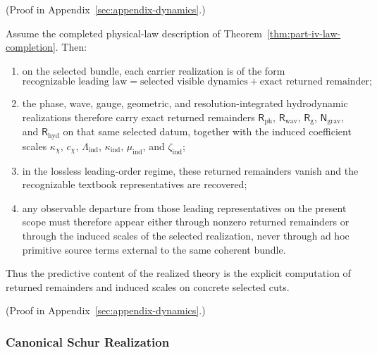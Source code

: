 (Proof in Appendix~\ref{sec:appendix-dynamics}.)

\begin{theorem}
\label{thm:returned-remainders-form-predictive-correction-surface}
Assume the completed physical-law description of
Theorem~\ref{thm:part-iv-law-completion}. Then:
\begin{enumerate}[label=(\alph*), leftmargin=2em, itemsep=0.2em]
\item on the selected bundle, each carrier realization is of the form
      \[
      \text{recognizable leading law}
      =
      \text{selected visible dynamics}
      +
      \text{exact returned remainder};
      \]
\item the phase, wave, gauge, geometric, and resolution-integrated
      hydrodynamic realizations therefore carry exact returned remainders
      \(\mathsf R_{\mathrm{ph}}\),
      \(\mathsf R_{\mathrm{wav}}\),
      \(\mathsf R_{\mathrm g}\),
      \(\mathsf N_{\mathrm{grav}}\), and
      \(\mathsf R_{\mathrm{hyd}}\) on that same selected datum, together with
      the induced coefficient scales
      \(\kappa_{\chi}\),
      \(c_{\chi}\),
      \(\Lambda_{\mathrm{ind}}\),
      \(\kappa_{\mathrm{ind}}\),
      \(\mu_{\mathrm{ind}}\), and
      \(\zeta_{\mathrm{ind}}\);
\item in the lossless leading-order regime, these returned remainders vanish
      and the recognizable textbook representatives are recovered;
\item any observable departure from those leading representatives on the
      present scope must therefore appear either through nonzero returned
      remainders or through the induced scales of the selected realization,
      never through ad hoc primitive source terms external to the same
      coherent bundle.
\end{enumerate}
Thus the predictive content of the realized theory is the explicit computation
of returned remainders and induced scales on concrete selected cuts.
\end{theorem}

(Proof in Appendix~\ref{sec:appendix-dynamics}.)

\subsubsection{Canonical Schur Realization}

